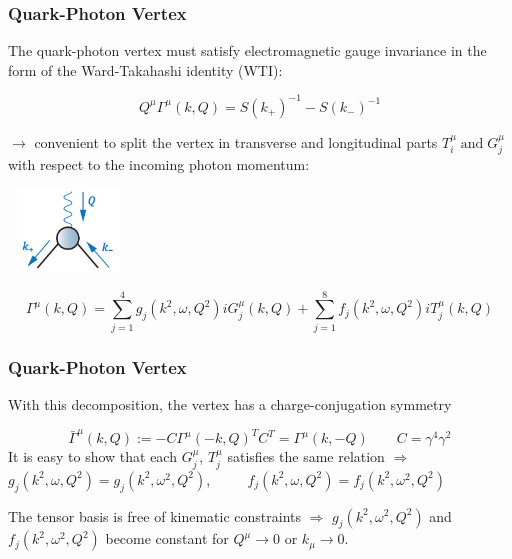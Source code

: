 \begin{frame}\frametitle{Quark-Photon Vertex}

The quark-photon vertex must satisfy electromagnetic gauge invariance in the form of the
Ward-Takahashi identity (WTI):

\begin{equation}
	Q^\mu\Gamma^\mu(k, Q)=S(k_+)^{-1}-S(k_-)^{-1}
\end{equation}

\begin{minipage}[r]{0.65\textwidth}
	$\rightarrow$ convenient to split the vertex in transverse and longitudinal parts $T_i^{\mu} \; \text{and} \; G_j^{\mu} $ with respect to the incoming photon momentum:
\end{minipage}
\begin{minipage}[r]{0.30\textwidth}
	\hspace{2mm}	
	\includegraphics[height=2.2cm, width=3.2cm]{Vertex.png}
\end{minipage}


\begin{equation}
	\Gamma^\mu(k,Q)=\sum_{j=1}^4 g_j(k^2, \omega, Q^2)iG^\mu_j(k, Q)+\sum_{j=1}^8 f_j(k^2, \omega, Q^2)iT^\mu_j(k, Q)
\end{equation}


\end{frame}

\begin{frame}\frametitle{Quark-Photon Vertex}
With this decomposition, the vertex has a charge-conjugation symmetry

\begin{equation}
	\bar{\Gamma}^\mu(k,Q):=-C\Gamma^\mu(-k,Q)^TC^T=\Gamma^\mu(k, -Q) \qquad C=\gamma^4\gamma^2
\end{equation}
\vspace{4mm}
It is easy to show that each $G_j^\mu$, $T_j^\mu$
satisfies the same relation $\Rightarrow$\\ \vspace{3mm} $g_j(k^2, \omega, Q^2)=g_j(k^2, \omega^2, Q^2)$, $\qquad$ $f_j(k^2, \omega, Q^2)=f_j(k^2, \omega^2, Q^2)$\\

\vspace{9mm}

The tensor basis  is free of kinematic constraints $\Rightarrow$ 
\vspace{2mm}
$g_j(k^2, \omega^2,Q^2)$ and $f_j(k^2, \omega^2,Q^2)$ become constant for $Q^\mu\to0$ or $k_\mu\to  0$.

\end{frame}


\endinput
